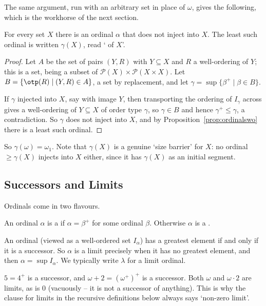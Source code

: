 The same argument, run with an arbitrary set in place of $\omega$, gives the following, which is the workhorse of the next section.

\begin{theorem}\label{thm:hartogs}
  For every set $X$ there is an ordinal $\alpha$ that does not inject into $X$. The least such ordinal is written $\gamma(X)$, read ` of $X$'.
\end{theorem}
\begin{proof}
  Let $A$ be the set of pairs $(Y, R)$ with $Y \subseteq X$ and $R$ a well-ordering of $Y$; this is a set, being a subset of $\mathcal{P}(X) \times \mathcal{P}(X \times X)$. Let $B = \{\otp(R) \mid (Y, R) \in A\}$, a set by replacement, and let $\gamma = \sup\{\beta^+ \mid \beta \in B\}$.

  If $\gamma$ injected into $X$, say with image $Y$, then transporting the ordering of $I_\gamma$ across gives a well-ordering of $Y \subseteq X$ of order type $\gamma$, so $\gamma \in B$ and hence $\gamma^+ \leq \gamma$, a contradiction. So $\gamma$ does not inject into $X$, and by Proposition~\ref{prop:ordinalswo} there is a least such ordinal.
\end{proof}

So $\gamma(\omega) = \omega_1$. Note that $\gamma(X)$ is a genuine `size barrier' for $X$: no ordinal $\geq \gamma(X)$ injects into $X$ either, since it has $\gamma(X)$ as an initial segment.

\subsection{Successors and Limits}

Ordinals come in two flavours.

\begin{definition}
  An ordinal $\alpha$ is a  if $\alpha = \beta^+$ for some ordinal $\beta$. Otherwise $\alpha$ is a .
\end{definition}

An ordinal (viewed as a well-ordered set $I_\alpha$) has a greatest element if and only if it is a successor. So $\alpha$ is a limit precisely when it has no greatest element, and then $\alpha = \sup I_\alpha$. We typically write $\lambda$ for a limit ordinal.

\begin{example}
  $5 = 4^+$ is a successor, and $\omega + 2 = (\omega^+)^+$ is a successor. Both $\omega$ and $\omega \cdot 2$ are limits, as is $0$ (vacuously -- it is not a successor of anything). This is why the clause for limits in the recursive definitions below always says `non-zero limit'.
\end{example}

